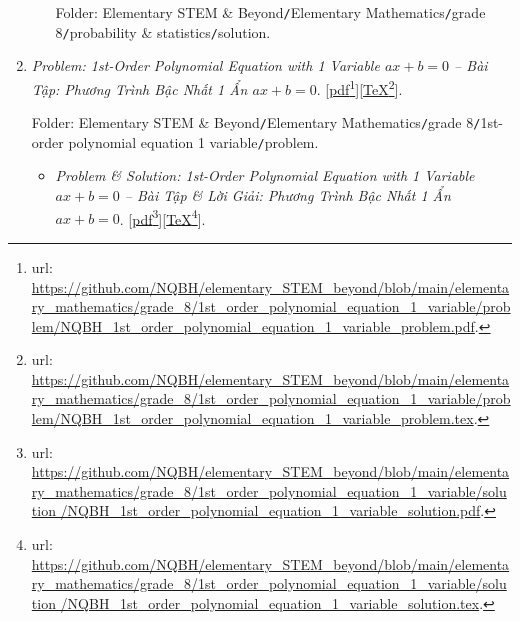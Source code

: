 \documentclass[12pt,oneside]{book}
\begin{document}
\begin{enumerate}
\begin{itemize}
		Folder: {\sf Elementary STEM \& Beyond{\tt/}Elementary Mathematics{\tt/}grade 8{\tt/}probability \& statistics{\tt/}solution}.
	\end{itemize}
	\item {\it Problem: 1st-Order Polynomial Equation with 1 Variable $ax + b = 0$ -- Bài Tập: Phương Trình Bậc Nhất 1 Ẩn $ax + b = 0$}. [\href{https://github.com/NQBH/elementary_STEM_beyond/blob/main/elementary_mathematics/grade_8/1st_order_polynomial_equation_1_variable/problem/NQBH_1st_order_polynomial_equation_1_variable_problem.pdf}{pdf}\footnote{{\sc url}: \url{https://github.com/NQBH/elementary_STEM_beyond/blob/main/elementary_mathematics/grade_8/1st_order_polynomial_equation_1_variable/problem/NQBH_1st_order_polynomial_equation_1_variable_problem.pdf}.}][\href{https://github.com/NQBH/elementary_STEM_beyond/blob/main/elementary_mathematics/grade_8/1st_order_polynomial_equation_1_variable/problem/NQBH_1st_order_polynomial_equation_1_variable_problem.tex}{\TeX}\footnote{{\sc url}: \url{https://github.com/NQBH/elementary_STEM_beyond/blob/main/elementary_mathematics/grade_8/1st_order_polynomial_equation_1_variable/problem/NQBH_1st_order_polynomial_equation_1_variable_problem.tex}.}].
	
	Folder: {\sf Elementary STEM \& Beyond{\tt/}Elementary Mathematics{\tt/}grade 8{\tt/}1st-order polynomial equation 1 variable{\tt/}problem}.
	\begin{itemize}
		\item {\it Problem \& Solution: 1st-Order Polynomial Equation with 1 Variable $ax + b = 0$ -- Bài Tập \& Lời Giải: Phương Trình Bậc Nhất 1 Ẩn $ax + b = 0$}. [\href{https://github.com/NQBH/elementary_STEM_beyond/blob/main/elementary_mathematics/grade_8/1st_order_polynomial_equation_1_variable/solution /NQBH_1st_order_polynomial_equation_1_variable_solution.pdf}{pdf}\footnote{{\sc url}: \url{https://github.com/NQBH/elementary_STEM_beyond/blob/main/elementary_mathematics/grade_8/1st_order_polynomial_equation_1_variable/solution /NQBH_1st_order_polynomial_equation_1_variable_solution.pdf}.}][\href{https://github.com/NQBH/elementary_STEM_beyond/blob/main/elementary_mathematics/grade_8/1st_order_polynomial_equation_1_variable/solution /NQBH_1st_order_polynomial_equation_1_variable_solution.tex}{\TeX}\footnote{{\sc url}: \url{https://github.com/NQBH/elementary_STEM_beyond/blob/main/elementary_mathematics/grade_8/1st_order_polynomial_equation_1_variable/solution /NQBH_1st_order_polynomial_equation_1_variable_solution.tex}.}].
		

\end{itemize}
\end{enumerate}
\end{document}
